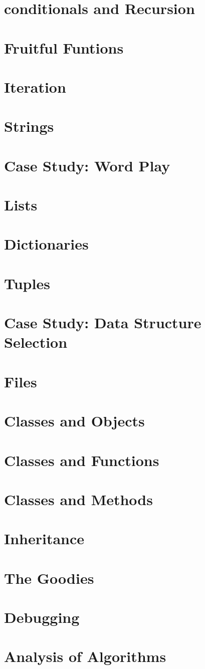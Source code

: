 \documentclass[a4paper,11pt]{book}
\begin{document}
\chapter{conditionals and Recursion}
\chapter{Fruitful Funtions}
\chapter{Iteration}
\chapter{Strings}
\chapter{Case Study: Word Play}
\chapter{Lists}
\chapter{Dictionaries}
\chapter{Tuples}
\chapter{Case Study: Data Structure Selection}
\chapter{Files}
\chapter{Classes and Objects}
\chapter{Classes and Functions}
\chapter{Classes and Methods}
\chapter{Inheritance}
\chapter{The Goodies}
\chapter{Debugging}
\chapter{Analysis of Algorithms}
\end{document}

